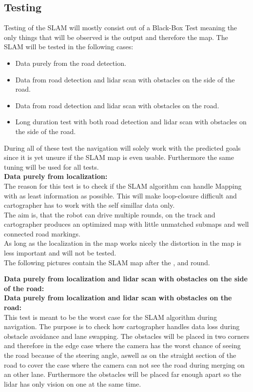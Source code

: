 \subsection{Testing}
Testing of the SLAM will mostly consist out of a Black-Box Test meaning the only things that will be observed is the output and therefore the map.
The SLAM will be tested in the following cases:
\begin{itemize}
	\item Data purely from the road detection.
	\item Data from road detection and lidar scan with obstacles on the side of the road.
	\item Data from road detection and lidar scan with obstacles on the road.
	\item Long duration test with both road detection and lidar scan with obstacles on the side of the road.
\end{itemize}

During all of these test the navigation will solely work with the predicted goals since it is yet unsure if the SLAM map is even usable. Furthermore the same tuning will be used for all tests.\\

\textbf{Data purely from localization:}\\
The reason for this test is to check if the SLAM algorithm can handle Mapping with as least information as possible. This will make loop-closure difficult and cartographer has to work with the self simillar data only.\\
The aim is, that the robot can drive multiple rounds, on the track and cartographer produces an optimized map with little unmatched submaps and well connected road markings.\\
As long as the localization in the map works nicely the distortion in the map is less important and will not be tested.\\

The following pictures contain the SLAM map after the , and  round.\\


\textbf{Data purely from localization and lidar scan with obstacles on the side of the road:}\\

\textbf{Data purely from localization and lidar scan with obstacles on the road:}\\
This test is meant to be the worst case for the SLAM algorithm during navigation. The purpose is to check how cartographer handles data loss during obstacle avoidance and lane swapping.
The obstacles will be placed in two corners and therefore in the edge case where the camera has the worst chance of seeing the road because of the steering angle, aswell as on the straight section of the road to cover the case where the camera can not see the road during merging on an other lane. Furthermore the obstacles will be placed far enough apart so the lidar has only vision on one at the same time.\\


